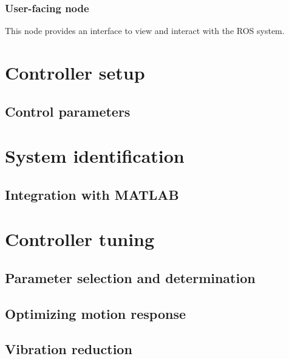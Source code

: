 \subsubsection{User-facing node}

This node provides an interface to view and interact with the ROS system. 

\section{Controller setup}

\subsection{Control parameters}



\section{System identification}

\subsection{Integration with MATLAB}

\section{Controller tuning}

\subsection{Parameter selection and determination}
\subsection{Optimizing motion response}
\subsection{Vibration reduction}

